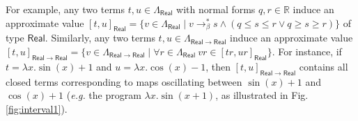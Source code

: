 For example, any two terms $t,u\in \Lambda_{\mathsf{Real}}$ with normal forms $q, r\in \mathbb{R}$ induce an approximate value $[t,u]_{\mathsf{Real}}= \{v\in \Lambda_{\mathsf{Real}}\mid  v\to_{\beta}^{*} s \land (q\leq s\leq r \vee q\geq s\geq r)\}$ of type $\mathsf{Real}$. Similarly, any two terms $t,u\in \Lambda_{\mathsf{Real}\to \mathsf{Real}}$ induce an approximate value
$[t,u]_{\mathsf{Real}\to \mathsf{Real}}= \{v\in \Lambda_{\mathsf{Real}\to\mathsf{Real}}\mid  
\forall r \in \Lambda_{\mathsf{Real}} \ vr\in [ tr, ur]_{\mathsf{Real}} 
\}$. For instance, if $t= \lambda x.\sin(x)+1$ and $u=\lambda x.\cos(x)-1$, then 
$[t,u]_{\mathsf{Real}\to \mathsf{Real}}$ contains all closed terms corresponding to maps oscillating between $\sin (x)+1$ and $\cos(x)+1$ (\textit{e.g.} the program $\lambda x. \sin(x+1)$, as illustrated in Fig. \ref{fig:interval1}).

